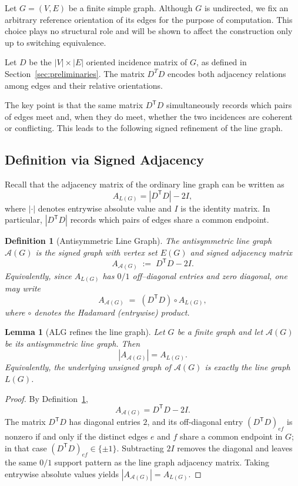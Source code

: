 \documentclass[11pt]{article}
\newtheorem{lemma}{Lemma}
\newtheorem{definition}{Definition}
\theoremstyle{plain}
\begin{document}
Let $G=(V,E)$ be a finite simple graph.
Although $G$ is undirected, we fix an arbitrary reference orientation of its
edges for the purpose of computation.
This choice plays no structural role and will be shown to affect the
construction only up to switching equivalence.

Let $D$ be the $|V|\times|E|$ oriented incidence matrix of $G$, as defined in
Section~\ref{sec:preliminaries}.
The matrix $D^TD$ encodes both adjacency relations among edges and their relative
orientations.

The key point is that the same matrix $D^{\mathsf T}D$ simultaneously records
which pairs of edges meet and, when they do meet, whether the two incidences are
coherent or conflicting. This leads to the following signed refinement of the
line graph.

\subsection{Definition via Signed Adjacency}

Recall that the adjacency matrix of the ordinary line graph can be written as
\[
A_{L(G)} = |D^{\mathsf T} D| - 2I,
\]
where $|\cdot|$ denotes entrywise absolute value and $I$ is the identity matrix.
In particular, $|D^{\mathsf T} D|$ records which pairs of edges share a common endpoint.

\begin{definition}[Antisymmetric Line Graph]
\label{def:ALG}
The \emph{antisymmetric line graph} $\mathcal{A}(G)$ is the signed graph with
vertex set $E(G)$ and signed adjacency matrix
\begin{equation}
\label{eq:ALG-def}
A_{\mathcal{A}(G)} \;:=\; D^{\mathsf T} D - 2I .
\end{equation}
Equivalently, since $A_{L(G)}$ has $0/1$ off--diagonal entries and zero diagonal,
one may write
\[
A_{\mathcal{A}(G)} \;=\; (D^{\mathsf T} D)\circ A_{L(G)},
\]
where $\circ$ denotes the Hadamard (entrywise) product.
\end{definition}

\begin{lemma}[ALG refines the line graph]
\label{lem:ALG-refines-LG}
Let $G$ be a finite graph and let $\mathcal A(G)$ be its antisymmetric line graph.
Then
\[
|A_{\mathcal A(G)}| = A_{L(G)}.
\]
Equivalently, the underlying unsigned graph of $\mathcal A(G)$ is exactly the
line graph $L(G)$.
\end{lemma}

\begin{proof}
By Definition~\ref{def:ALG},
\[
A_{\mathcal A(G)} = D^{\mathsf T}D - 2I.
\]
The matrix $D^{\mathsf T}D$ has diagonal entries $2$, and its off-diagonal entry
$(D^{\mathsf T}D)_{ef}$ is nonzero if and only if the distinct edges $e$ and $f$
share a common endpoint in $G$; in that case $(D^{\mathsf T}D)_{ef}\in\{\pm1\}$.
Subtracting $2I$ removes the diagonal and leaves the same $0/1$ support pattern
as the line graph adjacency matrix. Taking entrywise absolute values yields
$|A_{\mathcal A(G)}|=A_{L(G)}$.
\end{proof}
\end{document}
